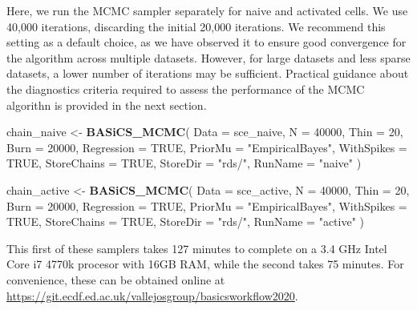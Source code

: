 \documentclass[9pt,a4paper,]{extarticle}
\newenvironment{Shaded}{\begin{snugshade}}{\end{snugshade}}
\newcommand{\DataTypeTok}[1]{\textcolor[rgb]{0.13,0.29,0.53}{#1}}
\newcommand{\DecValTok}[1]{\textcolor[rgb]{0.00,0.00,0.81}{#1}}
\newcommand{\KeywordTok}[1]{\textcolor[rgb]{0.13,0.29,0.53}{\textbf{#1}}}
\newcommand{\NormalTok}[1]{#1}
\newcommand{\OtherTok}[1]{\textcolor[rgb]{0.56,0.35,0.01}{#1}}
\newcommand{\StringTok}[1]{\textcolor[rgb]{0.31,0.60,0.02}{#1}}
\begin{document}
Here, we run the MCMC sampler separately for naive and activated cells.
We use 40,000 iterations, discarding the initial 20,000 iterations.
We recommend this setting as a default choice, as we have observed it to
ensure good convergence for the algorithm across multiple datasets.
However, for large datasets and less sparse datasets, a lower number of
iterations may be sufficient.
Practical guidance about the diagnostics criteria required to assess the
performance of the MCMC algorithn is provided in the next section.

\begin{Shaded}
\begin{Highlighting}[]
\NormalTok{chain_naive <-}\StringTok{ }\KeywordTok{BASiCS_MCMC}\NormalTok{(}
  \DataTypeTok{Data =}\NormalTok{ sce_naive,}
  \DataTypeTok{N =} \DecValTok{40000}\NormalTok{,}
  \DataTypeTok{Thin =} \DecValTok{20}\NormalTok{,}
  \DataTypeTok{Burn =} \DecValTok{20000}\NormalTok{,}
  \DataTypeTok{Regression =} \OtherTok{TRUE}\NormalTok{,}
  \DataTypeTok{PriorMu =} \StringTok{"EmpiricalBayes"}\NormalTok{,}
  \DataTypeTok{WithSpikes =} \OtherTok{TRUE}\NormalTok{,}
  \DataTypeTok{StoreChains =} \OtherTok{TRUE}\NormalTok{,}
  \DataTypeTok{StoreDir =} \StringTok{"rds/"}\NormalTok{,}
  \DataTypeTok{RunName =} \StringTok{"naive"}
\NormalTok{)}

\NormalTok{chain_active <-}\StringTok{ }\KeywordTok{BASiCS_MCMC}\NormalTok{(}
  \DataTypeTok{Data =}\NormalTok{ sce_active,}
  \DataTypeTok{N =} \DecValTok{40000}\NormalTok{,}
  \DataTypeTok{Thin =} \DecValTok{20}\NormalTok{,}
  \DataTypeTok{Burn =} \DecValTok{20000}\NormalTok{,}
  \DataTypeTok{Regression =} \OtherTok{TRUE}\NormalTok{,}
  \DataTypeTok{PriorMu =} \StringTok{"EmpiricalBayes"}\NormalTok{,}
  \DataTypeTok{WithSpikes =} \OtherTok{TRUE}\NormalTok{,}
  \DataTypeTok{StoreChains =} \OtherTok{TRUE}\NormalTok{,}
  \DataTypeTok{StoreDir =} \StringTok{"rds/"}\NormalTok{,}
  \DataTypeTok{RunName =} \StringTok{"active"}
\NormalTok{)}
\end{Highlighting}
\end{Shaded}

This first of these samplers takes 127 minutes to complete on a 3.4 GHz Intel
Core i7 4770k procesor with 16GB RAM, while the second takes 75 minutes.
For convenience, these can be obtained online at
\url{https://git.ecdf.ed.ac.uk/vallejosgroup/basicsworkflow2020}.
\end{document}
